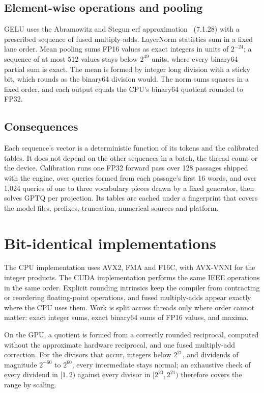 \documentclass[10pt]{article}
\begin{document}
\subsection{Element-wise operations and pooling}

GELU uses the Abramowitz and Stegun erf approximation~\cite{abramowitz1964}
(7.1.28) with a prescribed sequence of fused multiply-adds. LayerNorm
statistics sum in a fixed lane order. Mean pooling sums FP16 values as exact
integers in units of $2^{-24}$; a sequence of at most 512 values stays below
$2^{49}$ units, where every binary64 partial sum is exact. The mean is formed
by integer long division with a sticky bit, which rounds as the binary64
division would. The norm sums squares in a fixed order, and each output
equals the CPU's binary64 quotient rounded to FP32.

\subsection{Consequences}

Each sequence's vector is a deterministic function of its tokens and the
calibrated tables. It does not depend on the other sequences in a batch, the
thread count or the device. Calibration runs one FP32 forward pass over 128
passages shipped with the engine, over queries formed from each passage's
first 16 words, and over 1,024 queries of one to three vocabulary pieces drawn
by a fixed generator, then solves GPTQ per projection. Its tables are cached
under a
fingerprint that covers the model files, prefixes, truncation, numerical
sources and platform.

\section{Bit-identical implementations}
\label{sec:identity}

The CPU implementation uses AVX2, FMA and F16C, with AVX-VNNI for the integer
products. The CUDA implementation performs the same IEEE operations in the
same order. Explicit rounding intrinsics keep the compiler from contracting or
reordering floating-point operations, and fused multiply-adds appear exactly
where the CPU uses them. Work is split across threads only where order cannot
matter: exact integer sums, exact binary64 sums of FP16 values, and maxima.

On the GPU, a quotient is formed from a correctly rounded reciprocal, computed
without the approximate hardware reciprocal, and one fused multiply-add
correction. For the divisors that occur, integers below
$2^{21}$, and dividends of magnitude $2^{-60}$ to $2^{60}$, every intermediate
stays normal; an exhaustive check of every dividend in $[1, 2)$ against every
divisor in $[2^{20}, 2^{21})$ therefore covers the range by scaling.
\end{document}
